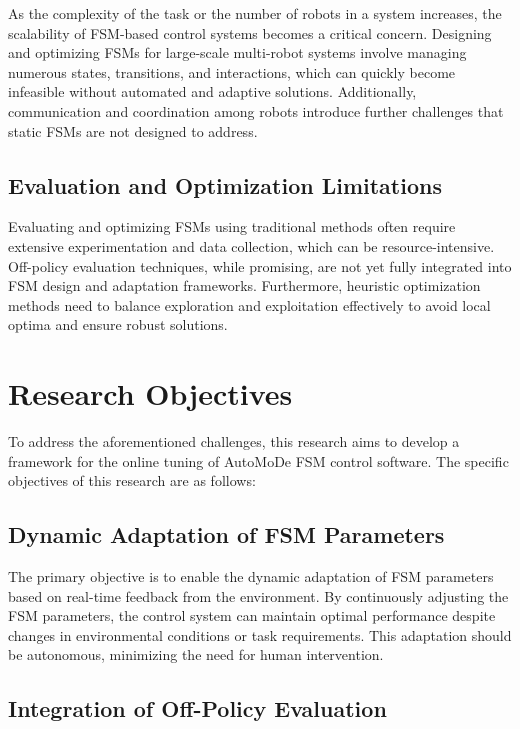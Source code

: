 \documentclass{ULBreport}
\begin{document}
As the complexity of the task or the number of robots in a system increases, the scalability of FSM-based control systems becomes a critical concern. Designing and optimizing FSMs for large-scale multi-robot systems involve managing numerous states, transitions, and interactions, which can quickly become infeasible without automated and adaptive solutions. Additionally, communication and coordination among robots introduce further challenges that static FSMs are not designed to address.

\subsection{Evaluation and Optimization Limitations}

Evaluating and optimizing FSMs using traditional methods often require extensive experimentation and data collection, which can be resource-intensive. Off-policy evaluation techniques, while promising, are not yet fully integrated into FSM design and adaptation frameworks. Furthermore, heuristic optimization methods need to balance exploration and exploitation effectively to avoid local optima and ensure robust solutions.

\section{Research Objectives}

To address the aforementioned challenges, this research aims to develop a framework for the online tuning of AutoMoDe FSM control software. The specific objectives of this research are as follows:

\subsection{Dynamic Adaptation of FSM Parameters}

The primary objective is to enable the dynamic adaptation of FSM parameters based on real-time feedback from the environment. By continuously adjusting the FSM parameters, the control system can maintain optimal performance despite changes in environmental conditions or task requirements. This adaptation should be autonomous, minimizing the need for human intervention.

\subsection{Integration of Off-Policy Evaluation}
\end{document}
